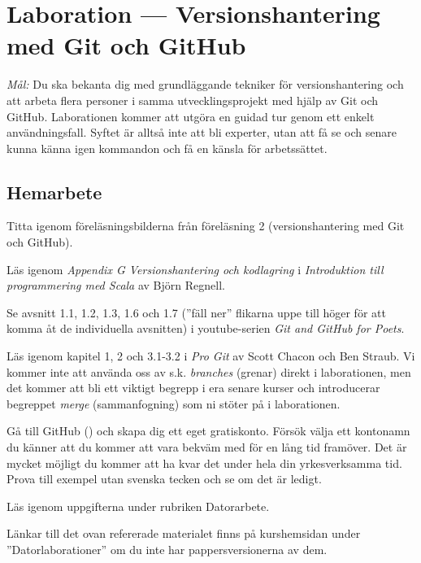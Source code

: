 \section{Laboration  --- Versionshantering med Git och GitHub}

\emph{Mål:} Du ska bekanta dig med grundläggande tekniker för versionshantering och att arbeta flera personer i samma utvecklingsprojekt med hjälp av Git och GitHub. Laborationen kommer att utgöra en guidad tur genom ett enkelt användningsfall. Syftet är alltså inte att bli experter, utan att få se och senare kunna känna igen kommandon och få en känsla för arbetssättet.

\subsection*{Hemarbete}
\begin{Hemarbete}\firmlist
	\item Titta igenom föreläsningsbilderna från föreläsning 2 (versionshantering med Git och GitHub).
	\item Läs igenom \emph{Appendix G Versionshantering och kodlagring} i \emph{Introduktion till programmering med Scala} av Björn Regnell.
	\item Se avsnitt 1.1, 1.2, 1.3, 1.6 och 1.7 (''fäll ner'' flikarna uppe till höger för att komma åt de individuella avsnitten) i youtube-serien \emph{Git and GitHub for Poets}.
	\item Läs igenom kapitel 1, 2 och 3.1-3.2 i \emph{Pro Git} av Scott Chacon och Ben Straub. Vi kommer inte att använda oss av s.k. \emph{branches} (grenar) direkt i laborationen, men det kommer att bli ett viktigt begrepp i era senare kurser och introducerar begreppet \emph{merge} (sammanfogning) som ni stöter på i laborationen.
	\item Gå till GitHub () och skapa dig ett eget gratiskonto. Försök välja ett kontonamn du känner att du kommer att vara bekväm med för en lång tid framöver. Det är mycket möjligt du kommer att ha kvar det under hela din yrkesverksamma tid. Prova till exempel  utan svenska tecken och se om det är ledigt.
	\item Läs igenom uppgifterna under rubriken Datorarbete.
\end{Hemarbete}
Länkar till det ovan refererade materialet finns på kurshemsidan under  ''Datorlaborationer'' om du inte har pappersversionerna av dem.

